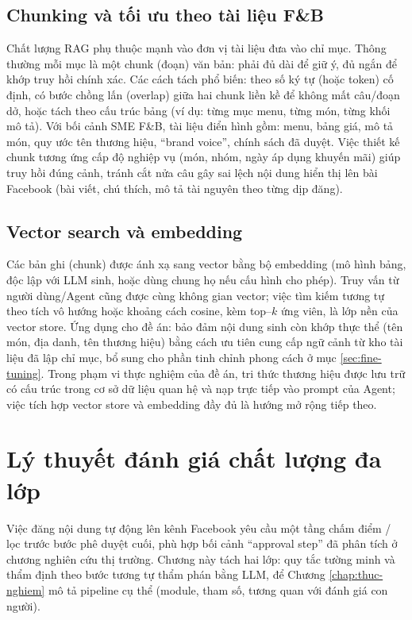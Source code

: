 \subsection{Chunking và tối ưu theo tài liệu F\&B}

Chất lượng RAG phụ thuộc mạnh vào đơn vị tài liệu đưa vào
chỉ mục. Thông thường mỗi mục là một chunk (đoạn) văn
bản: phải đủ dài để giữ ý, đủ ngắn để khớp truy hồi chính
xác. Các cách tách phổ biến: theo số ký tự (hoặc token) cố
định, có bước chồng lấn (overlap) giữa hai chunk liền
kề để không mất câu/đoạn dở, hoặc tách theo cấu trúc bảng
(ví dụ: từng mục menu, từng món, từng khối mô tả).
Với bối cảnh SME F\&B, tài liệu điển hình gồm: menu, bảng
giá, mô tả món, quy ước tên thương hiệu, ``brand voice'',
chính sách đã duyệt. Việc thiết kế chunk tương ứng cấp độ
nghiệp vụ (món, nhóm, ngày áp dụng khuyến mãi) giúp truy
hồi đúng cảnh, tránh cắt nửa câu gây sai lệch nội dung
hiển thị lên bài Facebook (bài viết, chú thích,
mô tả tài nguyên theo từng dịp đăng).

\subsection{Vector search và embedding}

Các bản ghi (chunk) được ánh xạ sang vector bằng bộ
embedding (mô hình bảng, độc lập với LLM sinh, hoặc
dùng chung họ nếu cấu hình cho phép). Truy vấn từ
người dùng/Agent cũng được cùng không gian vector; việc
tìm kiếm tương tự theo tích vô hướng hoặc khoảng cách
cosine, kèm top--$k$ ứng viên, là lớp nền
của vector store. Ứng dụng cho đề án: bảo đảm nội
dung sinh còn khớp thực thể (tên món, địa
danh, tên thương hiệu) bằng cách ưu tiên cung cấp ngữ
cảnh từ kho tài liệu đã lập chỉ mục, bổ sung cho phần
tinh chỉnh phong cách ở mục
\ref{sec:fine-tuning}. Trong phạm vi thực nghiệm của đề án,
tri thức thương hiệu được lưu trữ có cấu trúc trong cơ sở dữ liệu
quan hệ và nạp trực tiếp vào prompt của Agent; việc tích hợp
vector store và embedding đầy đủ là hướng mở rộng tiếp theo.

\section{Lý thuyết đánh giá chất lượng đa lớp}\label{sec:eval-metrics}

Việc đăng nội dung tự động lên kênh Facebook yêu cầu
một tầng chấm điểm / lọc trước bước phê
duyệt cuối, phù hợp bối cảnh ``approval step'' đã
phân tích ở chương nghiên cứu thị trường. Chương
này tách hai lớp: quy tắc tường minh và thẩm định theo bước
tương tự thẩm phán bằng LLM, để Chương
\ref{chap:thuc-nghiem} mô tả pipeline cụ
thể (module, tham số, tương quan với
đánh giá con người).

